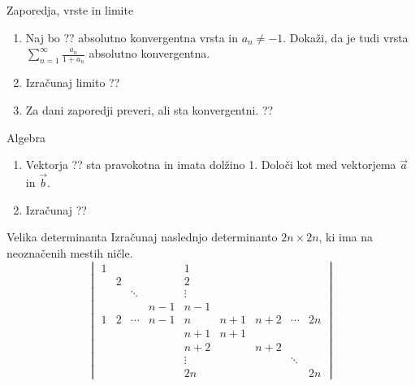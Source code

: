 \begin{frame}{Zaporedja, vrste in limite}
	\begin{enumerate}
		\item 
		Naj bo ?? absolutno konvergentna vrsta in $a_n \ne -1$.
		Dokaži, da je tudi vrsta $\sum_{n=1}^\infty \frac{a_n}{1+a_n}$
		absolutno konvergentna.

		\item
		Izračunaj limito
		??

		\item
		Za dani zaporedji preveri, ali sta konvergentni.
		??
	\end{enumerate}
\end{frame}

\begin{frame}{Algebra}
	\begin{enumerate}
		\item
		Vektorja ??
		sta pravokotna in imata dolžino 1. Določi kot med vektorjema $\vec{a}$ in $\vec{b}$.
		\item 
		Izračunaj
		??
	\end{enumerate}
\end{frame}

\begin{frame}{Velika determinanta}
	Izračunaj naslednjo determinanto $2n \times 2n$, ki ima na neoznačenih mestih ničle.
	\[
	\begin{vmatrix}
			1 &   &                       &     & 1                     &     &     &                       &     \\
			& 2 &                       &     & 2                     &     &     &                       &     \\
			&   & \ddots &     & \vdots &     &     &                       &     \\
			&   &                       & n-1 & n-1                   &     &     &                       &     \\
			1 & 2 & \cdots & n-1 & n                     & n+1 & n+2 & \cdots & 2n  \\
			&   &                       &     & n+1                   & n+1 &     &                       &     \\
			&   &                       &     & n+2                   &     & n+2 &                       &     \\
			&   &                       &     & \vdots &     &     & \ddots &     \\
			&   &                       &     & 2n                    &     &     &                       & 2n 
	\end{vmatrix}
	\]
\end{frame}

